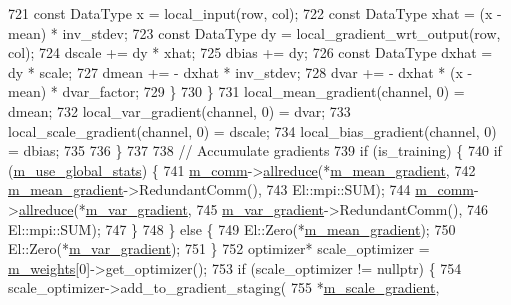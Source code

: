 \begin{DoxyCode}
721           \textcolor{keyword}{const} DataType x = local\_input(row, col);
722           \textcolor{keyword}{const} DataType xhat = (x - mean) * inv\_stdev;
723           \textcolor{keyword}{const} DataType dy = local\_gradient\_wrt\_output(row, col);
724           dscale += dy * xhat;
725           dbias += dy;
726           \textcolor{keyword}{const} DataType dxhat = dy * scale;
727           dmean += - dxhat * inv\_stdev;
728           dvar += - dxhat * (x - mean) * dvar\_factor;
729         \}
730       \}
731       local\_mean\_gradient(channel, 0) = dmean;
732       local\_var\_gradient(channel, 0) = dvar;
733       local\_scale\_gradient(channel, 0) = dscale;
734       local\_bias\_gradient(channel, 0) = dbias;
735 
736     \}
737 
738     \textcolor{comment}{// Accumulate gradients}
739     \textcolor{keywordflow}{if} (is\_training) \{
740       \textcolor{keywordflow}{if} (\hyperlink{classlbann_1_1batch__normalization_a0a33289150c01899f4b7ef2980771899}{m\_use\_global\_stats}) \{
741         \hyperlink{classlbann_1_1Layer_a5de05c52f22e0bbd7c703bec3ad4dbf2}{m\_comm}->\hyperlink{classlbann_1_1lbann__comm_af5631e5f0f54e4df4958eba9df2599ef}{allreduce}(*\hyperlink{classlbann_1_1batch__normalization_aa4677c2f7d5ea27c53bf0f61f280a2a3}{m\_mean\_gradient},
742                           \hyperlink{classlbann_1_1batch__normalization_aa4677c2f7d5ea27c53bf0f61f280a2a3}{m\_mean\_gradient}->RedundantComm(),
743                           El::mpi::SUM);
744         \hyperlink{classlbann_1_1Layer_a5de05c52f22e0bbd7c703bec3ad4dbf2}{m\_comm}->\hyperlink{classlbann_1_1lbann__comm_af5631e5f0f54e4df4958eba9df2599ef}{allreduce}(*\hyperlink{classlbann_1_1batch__normalization_aa2d2050a265eed854aa8950cd1461af9}{m\_var\_gradient},
745                           \hyperlink{classlbann_1_1batch__normalization_aa2d2050a265eed854aa8950cd1461af9}{m\_var\_gradient}->RedundantComm(),
746                           El::mpi::SUM);
747       \}
748     \} \textcolor{keywordflow}{else} \{
749       El::Zero(*\hyperlink{classlbann_1_1batch__normalization_aa4677c2f7d5ea27c53bf0f61f280a2a3}{m\_mean\_gradient});
750       El::Zero(*\hyperlink{classlbann_1_1batch__normalization_aa2d2050a265eed854aa8950cd1461af9}{m\_var\_gradient});
751     \}
752     optimizer* scale\_optimizer = \hyperlink{classlbann_1_1Layer_a7954e30fbf9100a6ba4b56d02767a469}{m\_weights}[0]->get\_optimizer();
753     \textcolor{keywordflow}{if} (scale\_optimizer != \textcolor{keyword}{nullptr}) \{
754       scale\_optimizer->add\_to\_gradient\_staging(
755         *\hyperlink{classlbann_1_1batch__normalization_a66364e1b0c9afb40a4c03ee1869d264c}{m\_scale\_gradient},

\end{DoxyCode}
